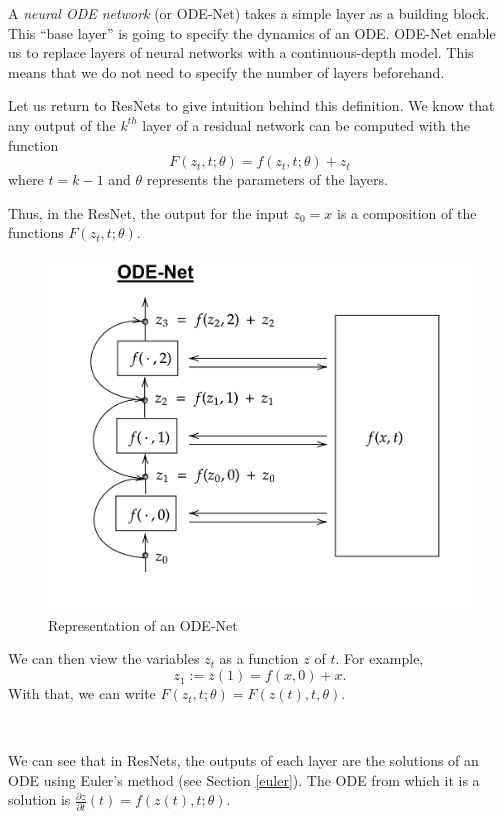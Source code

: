 \documentclass[10pt,a4paper]{article}
\theoremstyle{definition}
\theoremstyle{plain}
\begin{document}
A \textit{neural ODE network} (or ODE-Net) \cite{2,3,12} takes a simple layer as a building block. This “base layer” is going to specify the dynamics of an ODE.
ODE-Net enable us to replace layers of neural networks with a continuous-depth model. This means that we do not need to specify the number of layers beforehand.

Let us return to ResNets to give intuition behind this definition. We know that any output of the $k^{th}$ layer of a residual network can be computed with the function
\begin{equation*}
F(z_t, t; \theta) = f(z_t, t;\theta) + z_t
\end{equation*}
where $t = k - 1$ and $\theta$ represents the parameters of the layers.

Thus, in the ResNet, the output for the input $z_0 = x$ is a composition of the functions $F(z_t, t; \theta)$.


\begin{figure}
\center
\includegraphics[scale=0.18]{ODENet.png}
\caption{Representation of an ODE-Net}
\end{figure}

We can then view the variables $z_t$ as a function $z$ of $t$. For example,
\begin{equation*}
z_1 := z(1) = f(x, 0) + x.
\end{equation*}
With that, we can write $F(z_t, t; \theta) = F(z(t), t, \theta)$. 

~

We can see that in ResNets, the outputs of each layer are the solutions of an ODE using Euler's method (see Section \ref{euler}). The ODE from which it is a solution is $\frac{\partial z}{\partial t}(t) = f(z(t),t;\theta)$. 
\end{document}

